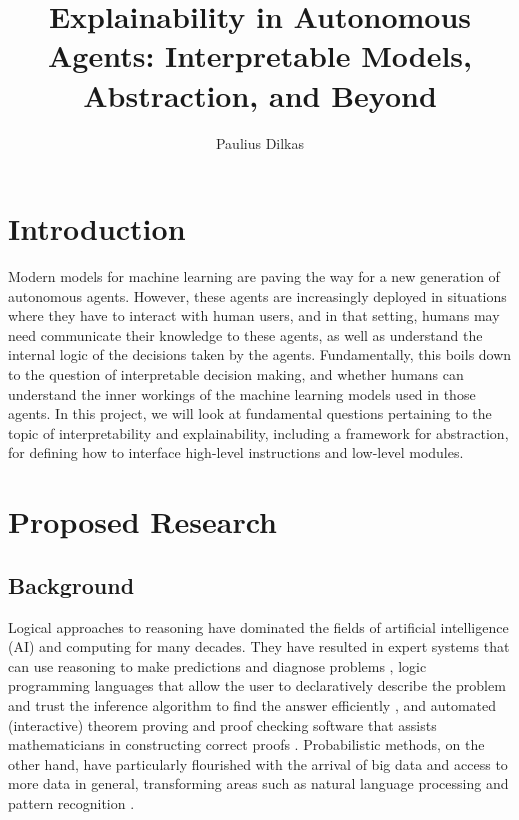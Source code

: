 \documentclass{article}
\begin{document}
\title{Explainability in Autonomous Agents: Interpretable Models, Abstraction,
  and Beyond}
\author{Paulius Dilkas}
\maketitle

\section{Introduction} %

Modern models for machine learning are paving the way for a new generation of
autonomous agents. However, these agents are increasingly deployed in situations
where they have to interact with human users, and in that setting, humans may
need communicate their knowledge to these agents, as well as understand the
internal logic of the decisions taken by the agents. Fundamentally, this boils
down to the question of interpretable decision making, and whether humans can
understand the inner workings of the machine learning models used in those
agents. In this project, we will look at fundamental questions pertaining to the
topic of interpretability and explainability, including a framework for
abstraction, for defining how to interface high-level instructions and low-level
modules.

\section{Proposed Research}

\subsection{Background}

Logical approaches to reasoning have dominated the fields of artificial
intelligence (AI) and computing for many decades. They have resulted in expert
systems that can use reasoning to make predictions and diagnose problems
\cite{hayes1983building}, logic programming languages that allow the user to
declaratively describe the problem and trust the inference algorithm to find the
answer efficiently \cite{DBLP:books/sp/Lloyd87}, and automated (interactive)
theorem proving and proof checking software that assists mathematicians in
constructing correct proofs \cite{DBLP:books/el/RobinsonV01}. Probabilistic
methods, on the other hand, have particularly flourished with the arrival of big
data and access to more data in general, transforming areas such as natural
language processing and pattern recognition \cite{DBLP:series/sci/BrazAR08}.
\end{document}
